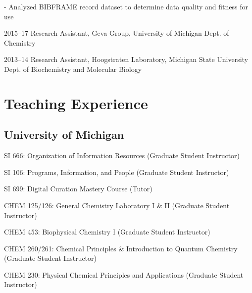\documentclass[12pt,letterpaper]{report}
\newcommand{\listitemspace}{0.25em}
\renewenvironment{itemize}
{\begin{list}{}{\setlength{\leftmargin}{0em}
            \setlength{\parskip}{0em}
            \setlength{\itemsep}{\listitemspace}
            \setlength{\parsep}{\listitemspace}}}
{\end{list}}
\begin{document}
\begin{tablist}
	\begin{itemize} \begin{footnotesize}

		\item - Analyzed BIBFRAME record dataset to determine data quality and fitness for use

	\end{footnotesize} \end{itemize}

	\item[2015--17] \tab Research Assistant, Geva Group, University of Michigan Dept. of Chemistry
	
	\item[2013--14] \tab Research Assistant, Hoogstraten Laboratory, Michigan State University Dept. of Biochemistry and Molecular Biology

\end{tablist}



\section*{Teaching Experience}

\subsection*{University of Michigan}
    
\begin{itemize}
    	
    	\item SI 666: Organization of Information Resources (Graduate Student Instructor)
        
	\item SI 106: Programs, Information, and People (Graduate Student Instructor)
        
	\item SI 699: Digital Curation Mastery Course (Tutor)
        
	\item CHEM 125/126: General Chemistry Laboratory I \& II (Graduate Student Instructor)
        
	\item CHEM 453: Biophysical Chemistry I (Graduate Student Instructor)
        
	\item CHEM 260/261: Chemical Principles \& Introduction to Quantum Chemistry (Graduate Student Instructor)
        
	\item CHEM 230: Physical Chemical Principles and Applications (Graduate Student Instructor)
    
\end{itemize}
    	
\end{document}
